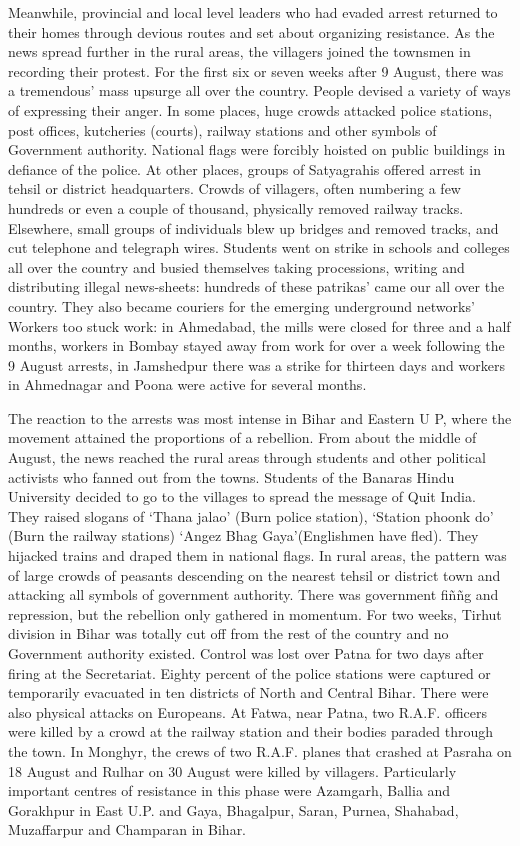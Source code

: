 Meanwhile, provincial and local level leaders who had evaded arrest returned to their homes through devious routes and set about organizing resistance. As the news spread further in the rural areas, the villagers joined the townsmen in recording their protest. For the first six or seven weeks after 9 August, there was a tremendous’ mass upsurge all over the country. People devised a variety of ways of expressing their anger. In some places, huge crowds attacked police stations, post offices, kutcheries (courts), railway stations and other symbols of Government authority. National flags were forcibly hoisted on public buildings in defiance of the police. At other places, groups of Satyagrahis offered arrest in tehsil or district headquarters. Crowds of villagers, often numbering a few hundreds or even a couple of thousand, physically removed railway tracks. Elsewhere, small groups of individuals blew up bridges and removed tracks, and cut telephone and telegraph wires. Students went on strike in schools and colleges all over the country and busied themselves taking processions, writing and distributing illegal news-sheets: hundreds of these patrikas’ came our all over the country. They also became couriers for the emerging underground networks’ Workers too stuck work: in Ahmedabad, the mills were closed for three and a half months, workers in Bombay stayed away from work for over a week following the 9 August arrests, in Jamshedpur there was a strike for thirteen days and workers in Ahmednagar and Poona were active for several months.

The reaction to the arrests was most intense in Bihar and Eastern U P, where the movement attained the proportions of a rebellion. From about the middle of August, the news reached the rural areas through students and other political activists who fanned out from the towns. Students of the Banaras Hindu University decided to go to the villages to spread the message of Quit India. They raised slogans of ‘Thana jalao’ (Burn police station), ‘Station phoonk do’ (Burn the railway stations) ‘Angez Bhag Gaya’(Englishmen have fled). They hijacked trains and draped them in national flags. In rural areas, the pattern was of large crowds of peasants descending on the nearest tehsil or district town and attacking all symbols of government authority. There was government fiññg and repression, but the rebellion only gathered in momentum. For two weeks, Tirhut division in Bihar was totally cut off from the rest of the country and no Government authority existed. Control was lost over Patna for two days after firing at the Secretariat. Eighty percent of the police stations were captured or temporarily evacuated in ten districts of North and Central Bihar. There were also physical attacks on Europeans. At Fatwa, near Patna, two R.A.F. officers were killed by a crowd at the railway station and their bodies paraded through the town. In Monghyr, the crews of two R.A.F. planes that crashed at Pasraha on 18 August and Rulhar on 30 August were killed by villagers. Particularly important centres of resistance in this phase were Azamgarh, Ballia and Gorakhpur in East U.P. and Gaya, Bhagalpur, Saran, Purnea, Shahabad, Muzaffarpur and Champaran in Bihar.

